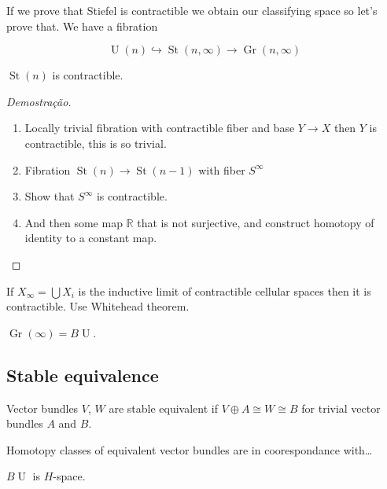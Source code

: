 If we prove that Stiefel is contractible we obtain our classifying space so let's prove that. We have a fibration

\[\operatorname{U}(n)\hookrightarrow \operatorname{St}(n,\infty)\to \operatorname{Gr}(n,\infty)\]

\begin{thm}
	$\operatorname{St}(n)$ is contractible.
\end{thm}

\begin{proof}[Demostra\c c\~ao]
	\begin{enumerate}[label=\textbf{Step \arabic*}]
		\item Locally trivial fibration with contractible fiber and base $Y\to X$ then $Y$ is contractible, this is so trivial.

		\item Fibration $ \operatorname{St}(n)\to \operatorname{St}(n-1)$ with fiber $S^\infty$ 

		\item Show that $S^\infty$ is contractible.

		\item And then some map $\mathbb{R}$ that is not surjective, and construct homotopy of identity to a constant map.
	\end{enumerate}
\end{proof}

\begin{exercise}
	If $X_{\infty}=\bigcup X_{i} $ is the inductive limit of contractible cellular spaces then it is contractible. Use Whitehead theorem.
\end{exercise}

\begin{thm}[Important]\leavevmode
	$\operatorname{Gr}(\infty)=B\operatorname{U}$.
\end{thm}

\subsection{Stable equivalence}

\begin{defn}
	Vector bundles $V$,  $W$ are stable equivalent if  $V\oplus A\cong W\cong B$ for trivial vector bundles  $A$ and $B$.
\end{defn}

Homotopy classes of equivalent vector bundles are in coorespondance with…

\begin{thm}
	$B\operatorname{U}$ is $H$-space.
\end{thm}

